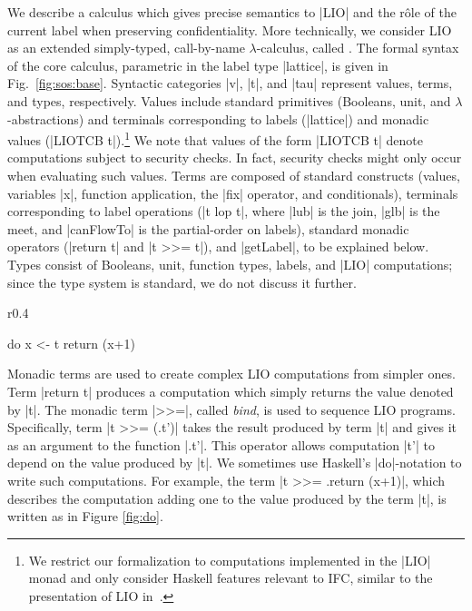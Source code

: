 We describe a calculus which gives precise semantics to |LIO| and the rôle of
the current label when preserving confidentiality. More technically, we consider
LIO as an extended simply-typed, call-by-name $\lambda$-calculus, called \lio.
%
The formal syntax of the core \lio{} calculus, parametric in the label
type |lattice|, is given in Fig.~\ref{fig:sos:base}.
%
Syntactic categories |v|, |t|, and |tau| represent values, terms, and
types, respectively.
%
Values include standard primitives (Booleans, unit, and $\lambda$-abstractions)
and terminals corresponding to labels (|lattice|) and monadic values (|LIOTCB
t|).\footnote{ We restrict our formalization to computations implemented in the
  |LIO| monad and only consider Haskell features relevant to IFC, similar to the
  presentation of LIO in~\cite{stefan:lio,stefan:addressing-covert}.  } We note
that values of the form |LIOTCB t| denote computations subject to security
checks. In fact, security checks might only occur when evaluating such values.
%
Terms are composed of standard constructs (values, variables |x|, function
application, the |fix| operator, and conditionals), terminals corresponding to
label operations (|t lop t|, where |lub| is the join, |glb| is the meet, and
|canFlowTo| is the partial-order on labels), standard monadic operators (|return
t| and |t >>= t|), and |getLabel|, to be explained below.
%
Types consist of Booleans, unit, function types, labels, and |LIO|
computations; since the \lio{} type system is standard, we do not
discuss it further.

\begin{wrapfigure}{r}{0.4\columnwidth}
\vspace{-15pt}
\begin{code}
do  x <- t 
    return (x+1) 
\end{code}
\vspace{-15pt}
\caption{\label{fig:do}|do|-notation}
\end{wrapfigure}
Monadic terms are used to create complex LIO computations from simpler
ones. Term |return t| produces a computation which simply returns the value
denoted by |t|. The monadic term |>>=|, called \emph{bind}, is used to sequence
LIO programs. Specifically, term |t >>= (\x.t')| takes the result produced by
term |t| and gives it as an argument to the function |\x.t'|.  This operator
allows computation |t'| to depend on the value produced by |t|.  We sometimes
use Haskell’s |do|-notation to write such computations. For example, the term |t
>>= \x.return (x+1)|, which describes the computation adding one to the value
produced by the term |t|, is written as in Figure \ref{fig:do}.

